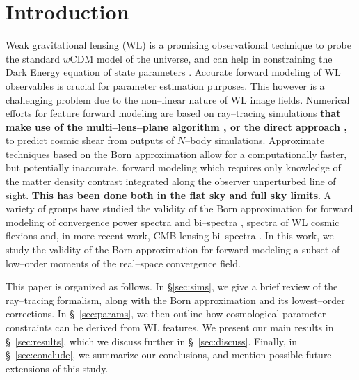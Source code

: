 \documentclass[reprint,aps,prd,superscriptaddress,showkeys,showpacs]{revtex4-1}
\begin{document}

\maketitle



\section{Introduction}
%
Weak gravitational lensing (WL) is a promising observational technique to probe the standard $w$CDM model of the universe, and can help in constraining the Dark Energy equation of state parameters \citep{wlreview}. Accurate forward modeling of WL observables is crucial for parameter estimation purposes. This however is a challenging problem due to the non--linear nature of WL image fields. Numerical efforts for feature forward modeling are based on ray--tracing simulations \textbf{\color{red} that make use of the multi--lens--plane algorithm \citep{RayTracingJain,RayTracingHartlap,RayTracingPN}, or the direct approach \citep{RayTracingBarreira},} to predict cosmic shear from outputs of $N$--body simulations. Approximate techniques based on the Born approximation allow for a computationally faster, but potentially inaccurate, forward modeling which requires only knowledge of the matter density contrast integrated along the observer unperturbed line of sight. \textbf{\color{blue} This has been done both in the flat sky \citep{RayTracingHartlap} and full sky \citep{Fosalba1,Fosalba2} limits}. A variety of groups have studied the validity of the Born approximation for forward modeling of convergence power spectra \citep{HirataKrause} and bi--spectra \citep{WLBispectrumDodelson}, spectra of WL cosmic flexions \citep{BornFlexion} and, in more recent work, CMB lensing bi--spectra \citep{CMBPrattenLewis}. In this work, we study the validity of the Born approximation for forward modeling a subset of low--order moments of the real--space convergence field. 

This paper is organized as follows.  In \S\ref{sec:sims}, we give a brief review of the ray--tracing formalism, along with the Born approximation and its lowest--order corrections. In \S~\ref{sec:params}, we then outline how cosmological parameter constraints can be derived from WL features. We present our main results in \S~\ref{sec:results}, which we discuss further in \S~\ref{sec:discuss}.  Finally, in \S~\ref{sec:conclude}, we summarize our conclusions, and mention possible future extensions of this study.       
\end{document}
